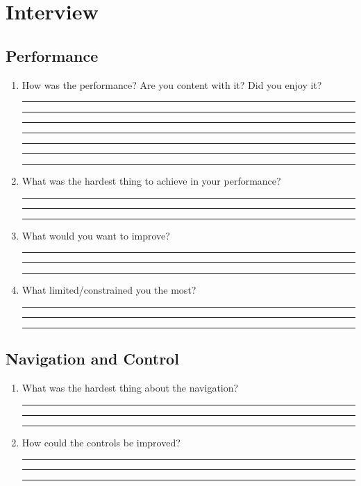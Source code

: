 \documentclass[10pt,a4paper]{scrartcl}
\begin{document}
\section{Interview}
\subsection{Performance}
\begin{enumerate}
\item How was the performance? Are you content with it? Did you enjoy it?\\
\rule{\linewidth}{0.25pt}
\rule{\linewidth}{0.25pt}
\rule{\linewidth}{0.25pt}
\rule{\linewidth}{0.25pt}
\rule{\linewidth}{0.25pt}
\rule{\linewidth}{0.25pt}
\rule{\linewidth}{0.25pt}

\item What was the hardest thing to achieve in your performance?\\
\rule{\linewidth}{0.25pt}
\rule{\linewidth}{0.25pt}
\rule{\linewidth}{0.25pt}

\item What would you want to improve?\\
\rule{\linewidth}{0.25pt}
\rule{\linewidth}{0.25pt}
\rule{\linewidth}{0.25pt}


\item What limited/constrained you the most?\\
\rule{\linewidth}{0.25pt}
\rule{\linewidth}{0.25pt}
\rule{\linewidth}{0.25pt}

\end{enumerate}
\subsection{Navigation and Control}
\begin{enumerate}
\item What was the hardest thing about the navigation?\\
\rule{\linewidth}{0.25pt}
\rule{\linewidth}{0.25pt}
\rule{\linewidth}{0.25pt}

\item How could the controls be improved?\\
\rule{\linewidth}{0.25pt}
\rule{\linewidth}{0.25pt}
\rule{\linewidth}{0.25pt}




\end{enumerate}
\end{document}
